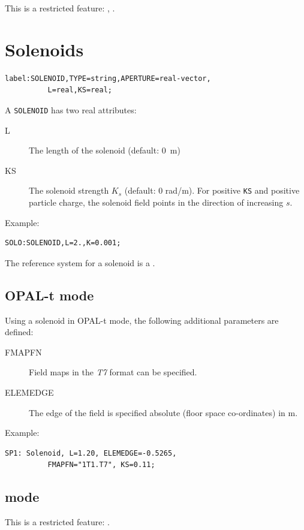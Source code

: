 This is a restricted feature: \noopalt, \noopalcycl .

\section{Solenoids}
\label{sec:solenoid}
\begin{verbatim}
label:SOLENOID,TYPE=string,APERTURE=real-vector,
          L=real,KS=real;
\end{verbatim}
A \texttt{SOLENOID} has two real attributes:
\begin{description}
\item[L]
  The length of the solenoid (default: 0~m)
\item[KS]
  The solenoid strength $K_s$ (default: 0 rad/m).
  For positive \texttt{KS} and positive particle charge,
  the solenoid field points in the direction of increasing $s$.
\end{description}
\noindent Example:
\begin{verbatim}
SOLO:SOLENOID,L=2.,K=0.001;
\end{verbatim}
The reference system for a solenoid is a 
.

\subsection{OPAL-t mode}
\label{sec:solenoid-t}
Using a solenoid in OPAL-t mode, the following additional parameters are defined:
\begin{description}
\item[FMAPFN]
  Field maps in the {\em T7} format can be specified.
\item[ELEMEDGE]
  The edge of the field is specified absolute (floor space co-ordinates) in m.
  \end{description}
\noindent Example:
\begin{verbatim}
SP1: Solenoid, L=1.20, ELEMEDGE=-0.5265, 
          FMAPFN="1T1.T7", KS=0.11;
\end{verbatim}

\subsection{\opalcycl mode}

This is a restricted feature: \noopalcycl .

